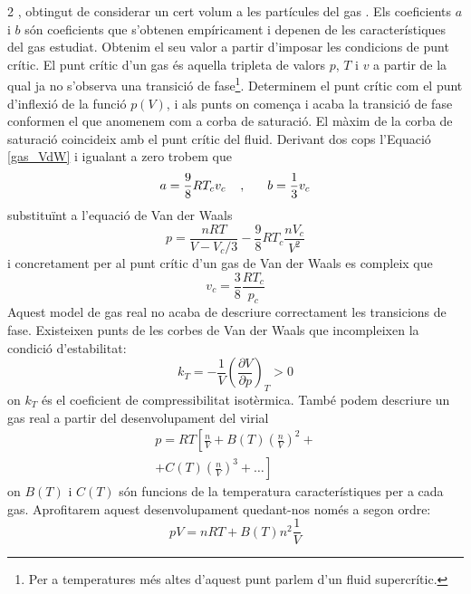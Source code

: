 \documentclass[12pt,twosides,onecolumn,openany]{article}
\begin{document}
\begin{multicols}{2}
, obtingut de considerar un cert volum a les partícules del gas \cite{physical_chemistry}. Els coeficients $a$ i $b$ són coeficients que s'obtenen empíricament i depenen de les característiques del gas estudiat. Obtenim el seu valor a partir d'imposar les condicions de punt crític. El punt crític d'un gas és aquella tripleta de valors $p$, $T$ i $v$ a partir de la qual ja no s'observa una transició de fase\footnote{Per a temperatures més altes d'aquest punt parlem d'un fluid supercrític.}. Determinem el punt crític com el punt d'inflexió de la funció $p(V)$, i als punts on comença i acaba la transició de fase conformen el que anomenem com a corba de saturació. El màxim de la corba de saturació coincideix amb el punt crític del fluid. Derivant dos cops l'Equació \eqref{gas_VdW} i igualant a zero trobem que
\begin{equation}\label{coef_VdW}
  a = \frac{9}{8} RT_cv_c \hspace{0.4cm} , \hspace{0.6cm} b=\frac{1}{3}v_c
\end{equation}
substituïnt a l'equació de Van der Waals
\begin{equation}\label{nostre_gas_VdW}
  p = \frac{nRT}{V-V_c/3} - \frac{9}{8}RT_c \frac{nV_c}{V^2}
\end{equation}
i concretament per al punt crític d'un gas de Van der Waals es compleix que
\begin{equation}\label{critic_VdW}
  v_c = \frac{3}{8} \frac{RT_c}{p_c}
\end{equation}
Aquest model de gas real no acaba de descriure correctament les transicions de fase. Existeixen punts de les corbes de Van der Waals que incompleixen la condició d'estabilitat:
\begin{equation}\label{cond_estabilitat}
  k_{T} = -\frac{1}{V}\left( \frac{\partial V}{\partial p} \right)_{T} > 0
\end{equation}
on $k_T$ és el coeficient de compressibilitat isotèrmica.
També podem descriure un gas real a partir del desenvolupament del virial
\begin{multline}\label{virial}
  p = RT \left[ \frac{n}{V} + B(T)\left( \frac{n}{V} \right)^2 + \right.\\ \left.+ C(T) \left( \frac{n}{V} \right)^3 + \dots \right]
\end{multline}
on $B(T)$ i $C(T)$ són funcions de la temperatura característiques per a cada gas. Aprofitarem aquest desenvolupament quedant-nos només a segon ordre:
\begin{equation}\label{virial_tallat}
  pV = nRT + B(T)n^2\frac{1}{V}
\end{equation}
    

\end{multicols}
\end{document}
